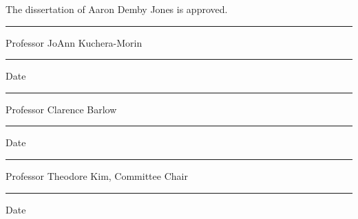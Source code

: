 \thispagestyle{empty}
The dissertation of Aaron Demby Jones is approved.
\vfil
\begin{minipage}{0.65\textwidth}
  \rule{\textwidth}{0.7pt}
  {\sc Professor JoAnn Kuchera-Morin}
\end{minipage}
\hfill
\begin{minipage}{0.25\textwidth}
  \rule{\textwidth}{0.7pt}
  {\sc Date}
\end{minipage}

\vfil
\begin{minipage}{0.65\textwidth}
  \rule{\textwidth}{0.7pt}
  {\sc Professor Clarence Barlow}
\end{minipage}
\hfill
\begin{minipage}{0.25\textwidth}
  \rule{\textwidth}{0.7pt}
  {\sc Date}
\end{minipage}

\vfil
\begin{minipage}{0.65\textwidth}
  \rule{\textwidth}{0.7pt}
  {\sc Professor Theodore Kim, Committee Chair}
\end{minipage}
\hfill
\begin{minipage}{0.25\textwidth}
  \rule{\textwidth}{0.7pt}
  {\sc Date}
\end{minipage}

